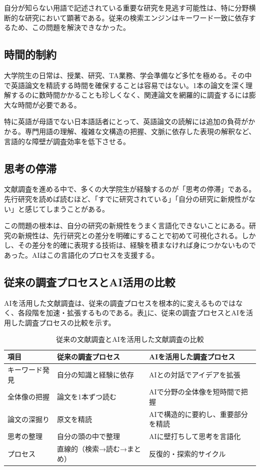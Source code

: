 自分が知らない用語で記述されている重要な研究を見逃す可能性は、特に分野横断的な研究において顕著である。従来の検索エンジンはキーワード一致に依存するため、この問題を解決できなかった。

\subsection{時間的制約}

大学院生の日常は、授業、研究、TA業務、学会準備など多忙を極める。その中で英語論文を精読する時間を確保することは容易ではない。1本の論文を深く理解するのに数時間かかることも珍しくなく、関連論文を網羅的に調査するには膨大な時間が必要である。

特に英語が母語でない日本語話者にとって、英語論文の読解には追加の負荷がかかる。専門用語の理解、複雑な文構造の把握、文脈に依存した表現の解釈など、言語的な障壁が調査効率を低下させる。

\subsection{思考の停滞}

文献調査を進める中で、多くの大学院生が経験するのが「思考の停滞」である。先行研究を読めば読むほど、「すでに研究されている」「自分の研究に新規性がない」と感じてしまうことがある。

この問題の根本は、自分の研究の新規性をうまく言語化できないことにある。研究の新規性は、先行研究との差分を明確にすることで初めて可視化される。しかし、その差分を的確に表現する技術は、経験を積まなければ身につかないものであった。AIはこの言語化のプロセスを支援する。

\subsection{従来の調査プロセスとAI活用の比較}

AIを活用した文献調査は、従来の調査プロセスを根本的に変えるものではなく、各段階を加速・拡張するものである。表\ref{tab:traditional-vs-ai}に、従来の調査プロセスとAIを活用した調査プロセスの比較を示す。

\begin{table}[htbp]
\centering
\caption{従来の文献調査とAIを活用した文献調査の比較}
\label{tab:traditional-vs-ai}
\footnotesize
\begin{tabular}{lp{3.2cm}p{3.8cm}}
\toprule
項目 & 従来の調査プロセス & AIを活用した調査プロセス \\
\midrule
キーワード発見 & 自分の知識と経験に依存 & AIとの対話でアイデアを拡張 \\
全体像の把握 & 論文を1本ずつ読む & AIで分野の全体像を短時間で把握 \\
論文の深掘り & 原文を精読 & AIで構造的に要約し、重要部分を精読 \\
思考の整理 & 自分の頭の中で整理 & AIに壁打ちして思考を言語化 \\
プロセス & 直線的（検索→読む→まとめ） & 反復的・探索的サイクル \\
\bottomrule
\end{tabular}
\end{table}

